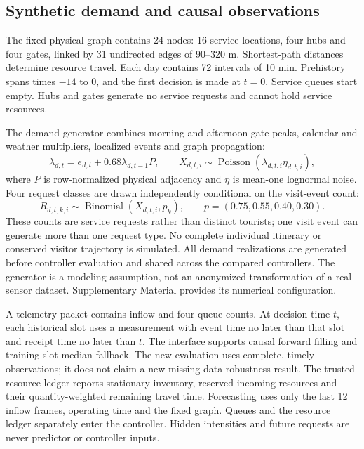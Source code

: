 \subsection{Synthetic demand and causal observations}
The fixed physical graph contains 24 nodes: 16 service locations, four hubs and four gates, linked by 31 undirected edges of 90--320 m. Shortest-path distances determine resource travel. Each day contains 72 intervals of 10 min. Prehistory spans times $-14$ to $0$, and the first decision is made at $t=0$. Service queues start empty. Hubs and gates generate no service requests and cannot hold service resources.

The demand generator combines morning and afternoon gate peaks, calendar and weather multipliers, localized events and graph propagation:
\begin{equation}
\lambda_{d,t}=e_{d,t}+0.68\lambda_{d,t-1}P,
\qquad X_{d,t,i}\sim\operatorname{Poisson}(\lambda_{d,t,i}\eta_{d,t,i}),
\end{equation}
where $P$ is row-normalized physical adjacency and $\eta$ is mean-one lognormal noise. Four request classes are drawn independently conditional on the visit-event count:
\begin{equation}
R_{d,t,k,i}\sim\operatorname{Binomial}(X_{d,t,i},p_k),
\qquad p=(0.75,0.55,0.40,0.30).
\end{equation}
These counts are service requests rather than distinct tourists; one visit event can generate more than one request type. No complete individual itinerary or conserved visitor trajectory is simulated. All demand realizations are generated before controller evaluation and shared across the compared controllers. The generator is a modeling assumption, not an anonymized transformation of a real sensor dataset. Supplementary Material provides its numerical configuration.

A telemetry packet contains inflow and four queue counts. At decision time $t$, each historical slot uses a measurement with event time no later than that slot and receipt time no later than $t$. The interface supports causal forward filling and training-slot median fallback. The new evaluation uses complete, timely observations; it does not claim a new missing-data robustness result. The trusted resource ledger reports stationary inventory, reserved incoming resources and their quantity-weighted remaining travel time. Forecasting uses only the last 12 inflow frames, operating time and the fixed graph. Queues and the resource ledger separately enter the controller. Hidden intensities and future requests are never predictor or controller inputs.

